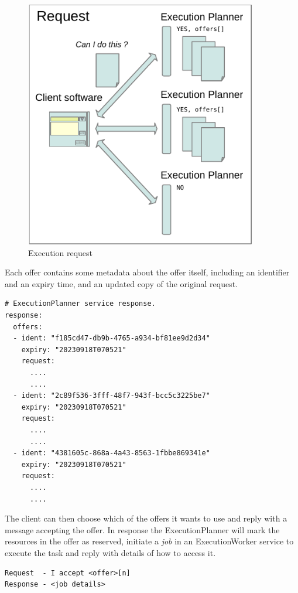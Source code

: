 \documentclass[11pt,a4paper]{ivoa}
\newcommand{\execplanner} {ExecutionPlanner}
\newcommand{\execworker} {ExecutionWorker}
\newcommand{\workerjob} {\textit{job}}
\begin{document}
\begin{figure}
\centering
\includegraphics[width=0.9\textwidth]{diagrams/request-offers.pdf}
\caption{Execution request}
\label{fig:discovery-diag}
\end{figure}

Each offer contains some metadata about the offer itself,
including an identifier and an expiry time,
and an updated copy of the original request.

\begin{lstlisting}[]
# ExecutionPlanner service response.
response:
  offers:
  - ident: "f185cd47-db9b-4765-a934-bf81ee9d2d34"
    expiry: "20230918T070521"
    request:
      ....
      ....
  - ident: "2c89f536-3fff-48f7-943f-bcc5c3225be7"
    expiry: "20230918T070521"
    request:
      ....
      ....
  - ident: "4381605c-868a-4a43-8563-1fbbe869341e"
    expiry: "20230918T070521"
    request:
      ....
      ....
\end{lstlisting}


The client can then choose which of the offers it wants to use and reply
with a message accepting the offer.
In response the \execplanner{} will mark the resources in the offer as reserved,
initiate a \workerjob{} in an \execworker{} service to execute the task
and reply with details of how to access it.

\begin{lstlisting}[]
Request  - I accept <offer>[n]
Response - <job details>
\end{lstlisting}
\end{document}
